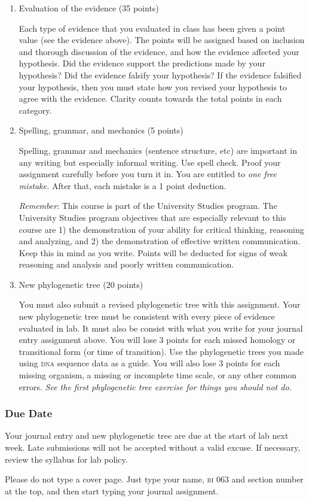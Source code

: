 \documentclass[12pt]{exam}
\begin{document}
\begin{enumerate}

\item Evaluation of the evidence (35 points)

Each type of evidence that you evaluated in class has been given a point
value (see the evidence above). The points will be assigned based on
inclusion and thorough discussion of the evidence, and how the evidence
affected your hypothesis. Did the evidence support the predictions made
by your hypothesis? Did the evidence falsify your hypothesis? If the
evidence falsified your hypothesis, then you must state how you revised
your hypothesis to agree with the evidence. Clarity counts towards the
total points in each category.

\item Spelling, grammar, and mechanics (5 points)

Spelling, grammar and
mechanics (sentence structure, etc) are important in any writing but especially informal writing. Use spell check. Proof your assignment carefully before you turn it in. You are entitled to \emph{one free
mistake.} After that, each mistake is a 1 point deduction.

\emph{Remember}: This course is part of the University Studies
program. The University Studies program objectives that are especially
relevant to this course are 1) the demonstration of your ability for
critical thinking, reasoning and analyzing, and 2) the demonstration of
effective written communication. Keep this in mind as you write. Points will be deducted for signs of
weak reasoning and analysis and poorly written communication.

\item New phylogenetic tree (20 points)

You must also submit a revised phylogenetic tree with this assignment. 
Your new phylogenetic tree must be consistent with every piece of
evidence evaluated in lab. It must also be consist with what you write
for your journal entry assignment above. You will lose 3
points for each missed homology or transitional form (or time of transition). 
Use the phylogenetic trees you made using \textsc{dna} sequence data as a guide.
You will also lose 3 points for each missing organism, a missing or incomplete time scale, 
or any other common errors. \emph{See the first phylogenetic tree exercise for things you should not do.}

\end{enumerate}


\subsubsection*{Due Date} 

Your journal entry and new phylogenetic tree are due at the start of lab next week. Late submissions will not be accepted without a valid excuse. If necessary, review the syllabus for lab policy.

Please do not type a cover page. Just type your name, \textsc{bi} 063 and section number at the
top, and then start typing your journal assignment.
\end{document}
